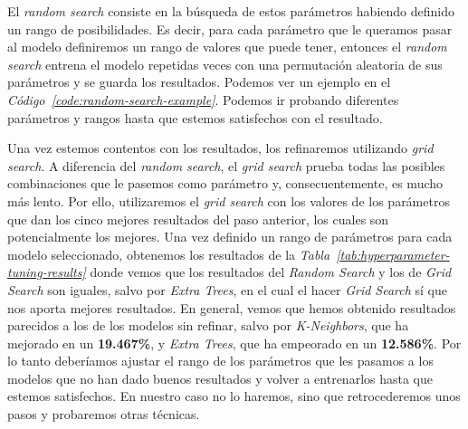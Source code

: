 El \textit{random search} consiste en la búsqueda de estos parámetros habiendo definido un rango de posibilidades. Es decir, para cada parámetro que le queramos pasar al modelo definiremos un rango de valores que puede tener, entonces el \textit{random search} entrena el modelo repetidas veces con una permutación aleatoria de sus parámetros y se guarda los resultados. Podemos ver un ejemplo en el \textit{Código\ \ref{code:random-search-example}}.
Podemos ir probando diferentes parámetros y rangos hasta que estemos satisfechos con el resultado.


Una vez estemos contentos con los resultados, los refinaremos utilizando \textit{grid search}. A diferencia del \textit{random search}, el \textit{grid search} prueba todas las posibles combinaciones que le pasemos como parámetro y, consecuentemente, es mucho más lento. Por ello, utilizaremos el \textit{grid search} con los valores de los parámetros que dan los cinco mejores resultados del paso anterior, los cuales son potencialmente los mejores. Una vez definido un rango de parámetros para cada modelo seleccionado, obtenemos los resultados de la \textit{Tabla\ \ref{tab:hyperparameter-tuning-results}} donde vemos que los resultados del \textit{Random Search} y los de \textit{Grid Search} son iguales, salvo por \textit{Extra Trees}, en el cual el hacer \textit{Grid Search} sí que nos aporta mejores resultados. En general, vemos que hemos obtenido resultados parecidos a los de los modelos sin refinar, salvo por \textit{K-Neighbors}, que ha mejorado en un \textbf{19.467\%}, y \textit{Extra Trees}, que ha empeorado en un \textbf{12.586\%}.
Por lo tanto deberíamos ajustar el rango de los parámetros que les pasamos a los modelos que no han dado buenos resultados y volver a entrenarlos hasta que estemos satisfechos. En nuestro caso no lo haremos, sino que retrocederemos unos pasos y probaremos otras técnicas.

